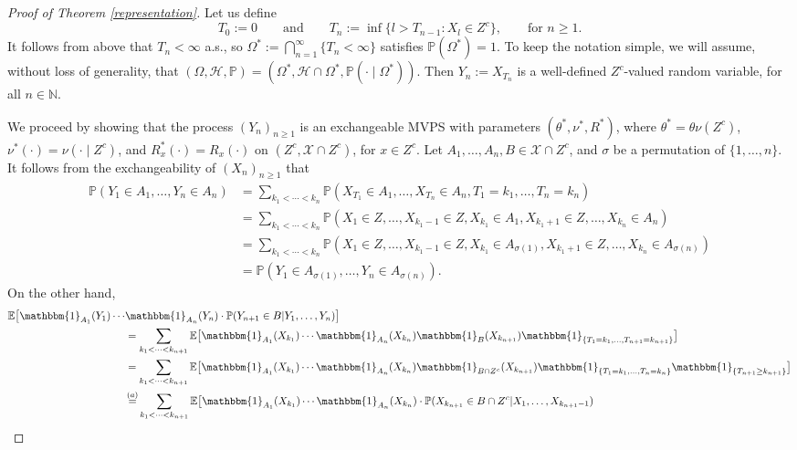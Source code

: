 \documentclass[a4paper]{article}
\theoremstyle{plain}
\theoremstyle{remark}
\theoremstyle{definition}
\begin{document}
\begin{proof}[Proof of Theorem \ref{representation}]
Let us define
\[T_0:=0\qquad\mbox{and}\qquad T_n:=\inf\{l>T_{n-1}:X_l\in Z^c\},\qquad\mbox{for }n\geq1.\]
It follows from above that $T_n<\infty$ a.s., so $\Omega^*:=\bigcap_{n=1}^\infty\{T_n<\infty\}$ satisfies $\mathbb{P}(\Omega^*)=1$. To keep the notation simple, we will assume, without loss of generality, that $(\Omega,\mathcal{H},\mathbb{P})=(\Omega^*, \mathcal{H}\cap\Omega^*,\mathbb{P}(\cdot\mid\Omega^*))$. Then $Y_n:=X_{T_n}$ is a well-defined $Z^c$-valued random variable, for all $n\in\mathbb{N}$.

We proceed by showing that the process $(Y_n)_{n\geq1}$ is an exchangeable MVPS with parameters $(\theta^*, \nu^*, R^*)$, where $\theta^*=\theta\nu(Z^c)$, $\nu^*(\cdot)=\nu(\cdot \mid Z^c)$, and $R_x^*(\cdot)=R_x(\cdot)$ on $(Z^c,\mathcal{X}\cap Z^c)$, for $x\in Z^c$. Let $A_1,\ldots,A_n,B\in\mathcal{X}\cap Z^c$, and $\sigma$ be a permutation of $\{1,\ldots,n\}$. It follows from the exchangeability of $(X_n)_{n\geq 1}$ that
\begingroup\allowdisplaybreaks
\begin{align*}
\mathbb{P}(Y_1 \in A_1, \ldots, Y_n \in A_n) &=\sum_{k_1<\cdots<k_n} \mathbb{P}(X_{T_1} \in A_1, \ldots, X_{T_n} \in A_n, T_1=k_1, \ldots, T_n=k_n)\\
&=\sum_{k_1<\cdots<k_n} \mathbb{P}(X_1 \in Z, \ldots, X_{k_1-1} \in Z, X_{k_1} \in A_1, X_{k_1+1} \in Z, \ldots, X_{k_n} \in A_n)\\
&=\sum_{k_1<\cdots<k_n} \mathbb{P}(X_{1} \in Z, \ldots, X_{k_1-1} \in Z, X_{k_1} \in A_{\sigma(1)}, X_{k_1+1} \in Z, \ldots, X_{k_n} \in A_{\sigma(n)})\\
&=\mathbb{P}(Y_1\in A_{\sigma(1)},\ldots,Y_n\in A_{\sigma(n)}).
\end{align*}
\endgroup
On the other hand, 
\begingroup\allowdisplaybreaks
\begin{align*}
\mathbb{E}\bigl[\mathbbm{1}_{A_1}(Y_1)\cdots&\mathbbm{1}_{A_n}(Y_n)\cdot\mathbb{P}(Y_{n+1}\in B|Y_1,\ldots,Y_n)\bigr]\\
&=\sum_{k_1<\cdots<k_{n+1}}\mathbb{E}\bigl[\mathbbm{1}_{A_1}(X_{k_1})\cdots\mathbbm{1}_{A_n}(X_{k_n})\mathbbm{1}_B(X_{k_{n+1}})\mathbbm{1}_{\{T_1=k_1,\ldots,T_{n+1}=k_{n+1}\}}\bigr]\\
&=\sum_{k_1<\cdots<k_{n+1}}\mathbb{E}\bigl[\mathbbm{1}_{A_1}(X_{k_1})\cdots\mathbbm{1}_{A_n}(X_{k_n})\mathbbm{1}_{B\cap Z^c}(X_{k_{n+1}})\mathbbm{1}_{\{T_1=k_1,\ldots,T_n=k_n\}}\mathbbm{1}_{\{T_{n+1}\geq k_{n+1}\}}\bigr]\\
&\begin{aligned}\,\overset{(a)}{=}&\sum_{k_1<\cdots<k_{n+1}}\mathbb{E}\bigl[\mathbbm{1}_{A_1}(X_{k_1})\cdots\mathbbm{1}_{A_n}(X_{k_n})\cdot\mathbb{P}(X_{k_{n+1}}\in B\cap Z^c|X_1,\ldots,X_{k_{n+1}-1})\\

\end{aligned}
\end{align*}
\end{proof}
\end{document}
